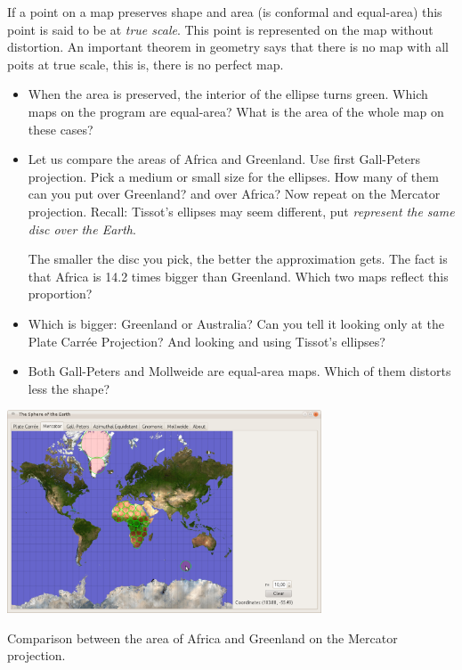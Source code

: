 \documentclass[a4paper,12pt]{article}
\begin{document}
If a point on a map preserves shape and area (is conformal and equal-area) this point is said to be at \emph{true scale}. This point is
represented on the map without distortion. An important theorem in geometry says that there is no map with all poits at true scale, this
is, there is no perfect map.

\begin{itemize}
 \item When the area is preserved, the interior of the ellipse turns green. Which maps on the program are equal-area? What is the area of
the whole map on these cases?
 
 \item Let us compare the areas of Africa and Greenland. Use first Gall-Peters projection. Pick a medium or small size for the ellipses.
How many of them can you put over Greenland? and over Africa? Now repeat on the Mercator projection. Recall: Tissot's ellipses may seem
different, put \emph{represent the same disc over the Earth}. 

  The smaller the disc you pick, the better the approximation gets. The fact is that Africa is 14.2 times bigger than Greenland. Which
two maps reflect this proportion?

 \item Which is bigger: Greenland or Australia? Can you tell it looking only at the Plate Carrée Projection? And looking and using Tissot's
ellipses?

 \item Both Gall-Peters and Mollweide are equal-area maps. Which of them distorts less the shape? 


\end{itemize}



 \begin{center}
  \includegraphics[width=0.7\textwidth]{merc1.png} 
  
{Comparison between the area of Africa and Greenland on the Mercator projection.}
 \end{center}
\end{document}
